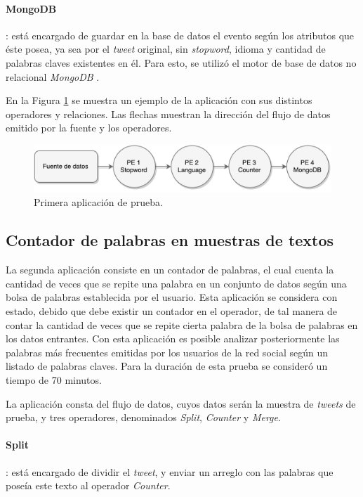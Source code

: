 \paragraph{MongoDB}: está encargado de guardar en la base de datos el evento según los atributos que éste posea, ya sea por el \textit{tweet} original, sin \textit{stopword}, idioma y cantidad de palabras claves existentes en él. Para esto, se utilizó el motor de base de datos no relacional \textit{MongoDB} \citep{chodorow2013mongodb}.

En la Figura \ref{fig:primeraAplicacion} se muestra un ejemplo de la aplicación con sus distintos operadores y relaciones. Las flechas muestran la dirección del flujo de datos emitido por la fuente y los operadores.

\begin{figure}[!hb]
	\centering
		\includegraphics[scale=0.75]{images/App1.pdf}
	\caption{Primera aplicación de prueba.}
	\label{fig:primeraAplicacion}
\end{figure}

\subsection{Contador de palabras en muestras de textos}
La segunda aplicación consiste en un contador de palabras, el cual cuenta la cantidad de veces que se repite una palabra en un conjunto de datos según una bolsa de palabras establecida por el usuario. Esta aplicación se considera con estado, debido que debe existir un contador en el operador, de tal manera de contar la cantidad de veces que se repite cierta palabra de la bolsa de palabras en los datos entrantes. Con esta aplicación es posible analizar posteriormente las palabras más frecuentes emitidas por los usuarios de la red social según un listado de palabras claves. Para la duración de esta prueba se consideró un tiempo de 70 minutos.

La aplicación consta del flujo de datos, cuyos datos serán la muestra de \textit{tweets} de prueba, y tres operadores, denominados \textit{Split}, \textit{Counter} y \textit{Merge}.

\paragraph{Split}: está encargado de dividir el \textit{tweet}, y enviar un arreglo con las palabras que poseía este texto al operador \textit{Counter}.

